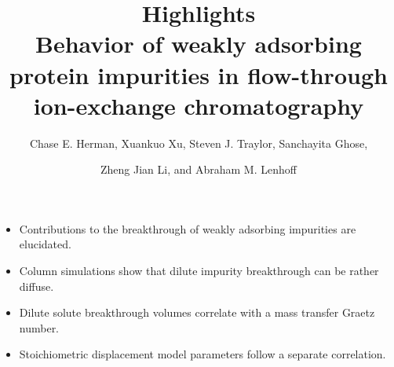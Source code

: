 \documentclass[12pt,a4paper]{article}
\title{{Highlights}\\[0mm] \large Behavior of weakly adsorbing protein impurities in flow-through ion-exchange chromatography}
\author{\normalsize Chase E. Herman, Xuankuo Xu, Steven J. Traylor, Sanchayita Ghose, \and  \normalsize Zheng Jian Li, and Abraham M. Lenhoff}
\date{}
\begin{document}
\maketitle

\begin{itemize}
    \item Contributions to the breakthrough of weakly adsorbing impurities are elucidated.
    \item Column simulations show that dilute impurity breakthrough can be rather diffuse.
    \item Dilute solute breakthrough volumes correlate with a mass transfer Graetz number.
    \item Stoichiometric displacement model parameters follow a separate correlation.
\end{itemize}
\end{document}
